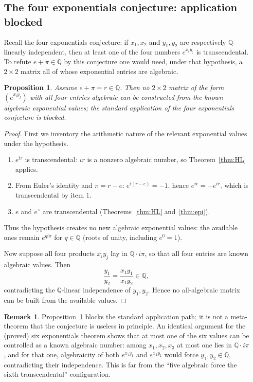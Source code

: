 \documentclass[11pt]{amsart}
\newtheorem{proposition}[theorem]{Proposition}
\theoremstyle{definition}
\newtheorem{remark}[theorem]{Remark}
\theoremstyle{remark}
\numberwithin{equation}{section}
\newcommand{\Q}{\mathbb{Q}}
\newcommand{\ee}{e}
\begin{document}
\subsection{The four exponentials conjecture: application blocked}

Recall the four exponentials conjecture: if $x_1,x_2$ and $y_1,y_2$ are respectively $\Q$-linearly independent, then at least one of the four numbers $\ee^{x_iy_j}$ is transcendental. To refute $e+\pi\in\Q$ by this conjecture one would need, under that hypothesis, a $2\times2$ matrix all of whose exponential entries are algebraic.

\begin{proposition}\label{prop:four-exp}
Assume $e+\pi=r\in\Q$. Then no $2\times2$ matrix of the form $(\ee^{x_iy_j})$ with all four entries algebraic can be constructed from the known algebraic exponential values; the standard application of the four exponentials conjecture is blocked.
\end{proposition}

\begin{proof}
First we inventory the arithmetic nature of the relevant exponential values under the hypothesis.
\begin{enumerate}
\item $\ee^{ir}$ is transcendental: $ir$ is a nonzero algebraic number, so Theorem~\ref{thm:HL} applies.
\item From Euler's identity and $\pi=r-e$: $\ee^{i(r-e)}=-1$, hence $\ee^{ie}=-\ee^{ir}$, which is transcendental by item 1.
\item $\ee$ and $\ee^\pi$ are transcendental (Theorems~\ref{thm:HL} and~\ref{thm:epi}).
\end{enumerate}
Thus the hypothesis creates no new algebraic exponential values: the available ones remain $\ee^{qi\pi}$ for $q\in\Q$ (roots of unity, including $\ee^0=1$).

Now suppose all four products $x_iy_j$ lay in $\Q\cdot i\pi$, so that all four entries are known algebraic values. Then
\[
\frac{y_1}{y_2}=\frac{x_1y_1}{x_1y_2}\in\Q,
\]
contradicting the $\Q$-linear independence of $y_1,y_2$. Hence no all-algebraic matrix can be built from the available values.
\end{proof}

\begin{remark}
Proposition~\ref{prop:four-exp} blocks the standard application path; it is not a meta-theorem that the conjecture is useless in principle. An identical argument for the (proved) six exponentials theorem shows that at most one of the six values can be controlled as a known algebraic number: among $x_1,x_2,x_3$ at most one lies in $\Q\cdot i\pi$, and for that one, algebraicity of both $\ee^{x_1y_1}$ and $\ee^{x_1y_2}$ would force $y_1,y_2\in\Q$, contradicting their independence. This is far from the ``five algebraic force the sixth transcendental'' configuration.
\end{remark}
\end{document}
